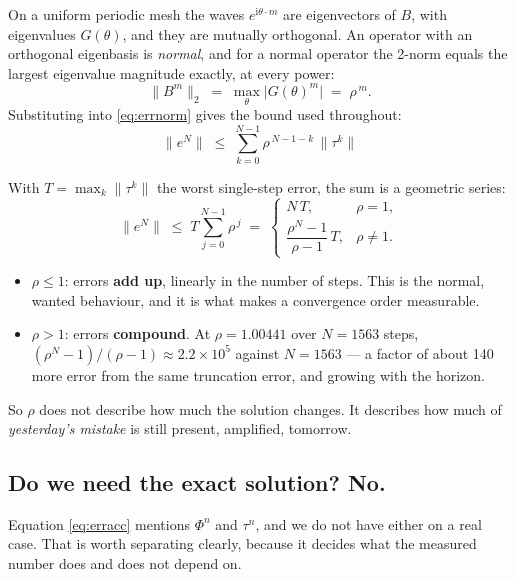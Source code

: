 \documentclass[11pt,a4paper]{article}
\begin{document}
On a uniform periodic mesh the waves \(e^{\mathrm{i}\theta\cdot m}\) are eigenvectors of \(B\),
with eigenvalues \(G(\theta)\), and they are mutually orthogonal. An operator with an orthogonal
eigenbasis is \emph{normal}, and for a normal operator the 2-norm equals the largest eigenvalue
magnitude exactly, at every power:
\begin{equation}
  \bigl\|B^{m}\bigr\|_2 \;=\; \max_\theta \bigl|G(\theta)^{m}\bigr| \;=\; \rho^{\,m}.
\end{equation}
Substituting into \eqref{eq:errnorm} gives the bound used throughout:
\begin{equation}
  \boxed{\;\|e^{N}\| \;\le\; \sum_{k=0}^{N-1} \rho^{\,N-1-k}\,\|\tau^{k}\|\;}
  \label{eq:erracc}
\end{equation}

With \(T = \max_k \|\tau^k\|\) the worst single-step error, the sum is a geometric series:
\begin{equation}
  \|e^{N}\| \;\le\; T \sum_{j=0}^{N-1}\rho^{\,j}
  \;=\;
  \begin{cases}
    N\,T, & \rho = 1,\\[4pt]
    \dfrac{\rho^{N}-1}{\rho-1}\,T, & \rho \ne 1 .
  \end{cases}
  \label{eq:geom}
\end{equation}

\begin{itemize}
\item \(\rho \le 1\): errors \textbf{add up}, linearly in the number of steps. This is the
      normal, wanted behaviour, and it is what makes a convergence order measurable.
\item \(\rho > 1\): errors \textbf{compound}. At \(\rho = 1.00441\) over \(N = 1563\) steps,
      \((\rho^N-1)/(\rho-1) \approx 2.2\times10^{5}\) against \(N = 1563\) --- a factor of about
      140 more error from the same truncation error, and growing with the horizon.
\end{itemize}

So \(\rho\) does not describe how much the solution changes. It describes how much of
\emph{yesterday's mistake} is still present, amplified, tomorrow.

\subsection{Do we need the exact solution? No.}

Equation \eqref{eq:erracc} mentions \(\Phi^n\) and \(\tau^n\), and we do not have either on a
real case. That is worth separating clearly, because it decides what the measured number does
and does not depend on.
\end{document}
